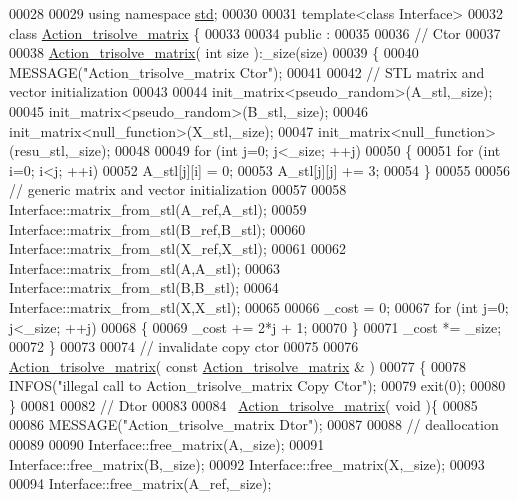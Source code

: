 \begin{DoxyCode}
00028 
00029 \textcolor{keyword}{using namespace }\hyperlink{namespacestd}{std};
00030 
00031 \textcolor{keyword}{template}<\textcolor{keyword}{class} Interface>
00032 \textcolor{keyword}{class }\hyperlink{class_action__trisolve__matrix}{Action\_trisolve\_matrix} \{
00033 
00034 public :
00035 
00036   \textcolor{comment}{// Ctor}
00037 
00038   \hyperlink{class_action__trisolve__matrix}{Action\_trisolve\_matrix}( \textcolor{keywordtype}{int} size ):\_size(size)
00039   \{
00040     MESSAGE(\textcolor{stringliteral}{"Action\_trisolve\_matrix Ctor"});
00041 
00042     \textcolor{comment}{// STL matrix and vector initialization}
00043 
00044     init\_matrix<pseudo\_random>(A\_stl,\_size);
00045     init\_matrix<pseudo\_random>(B\_stl,\_size);
00046     init\_matrix<null\_function>(X\_stl,\_size);
00047     init\_matrix<null\_function>(resu\_stl,\_size);
00048 
00049     \textcolor{keywordflow}{for} (\textcolor{keywordtype}{int} j=0; j<\_size; ++j)
00050     \{
00051       \textcolor{keywordflow}{for} (\textcolor{keywordtype}{int} i=0; i<j; ++i)
00052         A\_stl[j][i] = 0;
00053       A\_stl[j][j] += 3;
00054     \}
00055 
00056     \textcolor{comment}{// generic matrix and vector initialization}
00057 
00058     Interface::matrix\_from\_stl(A\_ref,A\_stl);
00059     Interface::matrix\_from\_stl(B\_ref,B\_stl);
00060     Interface::matrix\_from\_stl(X\_ref,X\_stl);
00061 
00062     Interface::matrix\_from\_stl(A,A\_stl);
00063     Interface::matrix\_from\_stl(B,B\_stl);
00064     Interface::matrix\_from\_stl(X,X\_stl);
00065 
00066     \_cost = 0;
00067     \textcolor{keywordflow}{for} (\textcolor{keywordtype}{int} j=0; j<\_size; ++j)
00068     \{
00069       \_cost += 2*j + 1;
00070     \}
00071     \_cost *= \_size;
00072   \}
00073 
00074   \textcolor{comment}{// invalidate copy ctor}
00075 
00076   \hyperlink{class_action__trisolve__matrix}{Action\_trisolve\_matrix}( \textcolor{keyword}{const}  \hyperlink{class_action__trisolve__matrix}{Action\_trisolve\_matrix} & )
00077   \{
00078     INFOS(\textcolor{stringliteral}{"illegal call to Action\_trisolve\_matrix Copy Ctor"});
00079     exit(0);
00080   \}
00081 
00082   \textcolor{comment}{// Dtor}
00083 
00084   ~\hyperlink{class_action__trisolve__matrix}{Action\_trisolve\_matrix}( \textcolor{keywordtype}{void} )\{
00085 
00086     MESSAGE(\textcolor{stringliteral}{"Action\_trisolve\_matrix Dtor"});
00087 
00088     \textcolor{comment}{// deallocation}
00089 
00090     Interface::free\_matrix(A,\_size);
00091     Interface::free\_matrix(B,\_size);
00092     Interface::free\_matrix(X,\_size);
00093 
00094     Interface::free\_matrix(A\_ref,\_size);

\end{DoxyCode}
